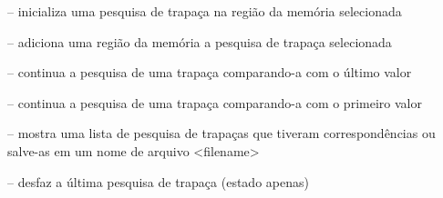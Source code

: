 \documentclass[letterpaper,10pt,brazil]{sphinxmanual}
\begin{document}
\begin{DUlineblock}{0em}
\item[] {\hyperref[debugger/cheats:debugger\string-command\string-cheatinit]{}} -- inicializa uma pesquisa de trapaça na região da memória selecionada
\item[] {\hyperref[debugger/cheats:debugger\string-command\string-cheatrange]{}} -- adiciona uma região da memória a pesquisa de trapaça selecionada
\item[] {\hyperref[debugger/cheats:debugger\string-command\string-cheatnext]{}} -- continua a pesquisa de uma trapaça comparando-a com o último valor
\item[] {\hyperref[debugger/cheats:debugger\string-command\string-cheatnextf]{}} -- continua a pesquisa de uma trapaça comparando-a com o primeiro valor
\item[] {\hyperref[debugger/cheats:debugger\string-command\string-cheatlist]{}} -- mostra uma lista de pesquisa de trapaças que tiveram correspondências ou salve-as em um nome de arquivo \textless{}filename\textgreater{}
\item[] {\hyperref[debugger/cheats:debugger\string-command\string-cheatundo]{}} -- desfaz a última pesquisa de trapaça (estado apenas)
\end{DUlineblock}
\begin{quote}
\label{debugger/cheats:debugger-command-cheatinit}\end{quote}
\end{document}
